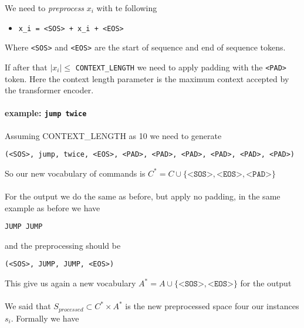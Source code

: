 \documentclass[]{article}
\begin{document}
We need to \textit{preprocess} $x_i$ with te following

\begin{itemize}
    \item \texttt{x\_i = <SOS> + x\_i + <EOS>}
\end{itemize}
Where \texttt{<SOS>} and \texttt{<EOS>} are the start of sequence and end of sequence tokens.

If after that $|x_i| \leq $ \texttt{CONTEXT\_LENGTH} we need to apply padding with the \texttt{<PAD>} token. Here the context length parameter is the maximum context accepted by the transformer encoder.

\paragraph*{example: \texttt{jump twice}}

Assuming CONTEXT\_LENGTH as 10 we need to generate

\begin{center}
    \texttt{(<SOS>, jump, twice, <EOS>, <PAD>, <PAD>, <PAD>, <PAD>, <PAD>, <PAD>)}
\end{center}

So our new vocabulary of commands is $C^* = C \cup \{\texttt{<SOS>}, \texttt{<EOS>}, \texttt{<PAD>}\}$

\paragraph*{}
For the output we do the same as before, but apply no padding, in the same example as before we have

\begin{center}
    \texttt{JUMP JUMP}
\end{center}

and the preprocessing should be

\begin{center}
    \texttt{(<SOS>, JUMP, JUMP, <EOS>)}
\end{center}

This give us again a new vocabulary $A^* = A \cup \{\texttt{<SOS>}, \texttt{<EOS>}\}$ for the output

\paragraph*{}
We said that $S_{processed} \subset C^* \times A^*$ is the new preprocessed space four our instances $s_i$. Formally we have
\end{document}
